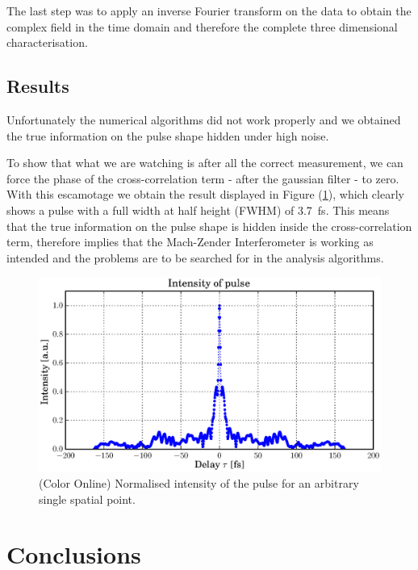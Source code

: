 \documentclass[12pt,a4paper,twoside]{article}
\begin{document}
The last step was to apply an inverse Fourier transform on the data to obtain the complex field in the time domain and therefore the complete three dimensional characterisation.
\subsection{Results}
Unfortunately the numerical algorithms did not work properly and we obtained the true information on the pulse shape hidden under high noise.

To show that what we are watching is after all the correct measurement, we can force the phase of the cross-correlation term - after the gaussian filter - to zero.
With this escamotage we obtain the result displayed in Figure (\ref{fig_result}), which clearly shows a pulse with a full width at half height (FWHM) of \SI{3.7}{\fs}.
This means that the true information on the pulse shape is hidden inside the cross-correlation term, therefore implies that the Mach-Zender Interferometer is working as intended and the problems are to be searched for in the analysis algorithms.

\begin{figure}[h!]
	\centering
	\includegraphics[scale=0.9]{data/intensity}
	\caption{(Color Online) Normalised intensity of the pulse for an arbitrary single spatial point.}
	\label{fig_result}
\end{figure}

\section{Conclusions}
\end{document}

